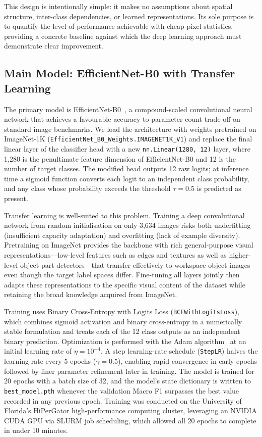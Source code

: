 \documentclass[10pt]{article}
\begin{document}
This design is intentionally simple: it makes no assumptions about spatial structure, inter-class
dependencies, or learned representations.  Its sole purpose is to quantify the level of
performance achievable with cheap pixel statistics, providing a concrete baseline against which
the deep learning approach must demonstrate clear improvement.

\subsection*{Main Model: EfficientNet-B0 with Transfer Learning}

The primary model is EfficientNet-B0~\cite{tan2019efficientnet}, a compound-scaled convolutional
neural network that achieves a favourable accuracy-to-parameter-count trade-off on standard image
benchmarks.  We load the architecture with weights pretrained on ImageNet-1K
(\texttt{EfficientNet\_B0\_Weights.IMAGENET1K\_V1}) and replace the final linear layer of the
classifier head with a new \texttt{nn.Linear(1280,\,12)} layer, where 1,280 is the penultimate
feature dimension of EfficientNet-B0 and 12 is the number of target classes.  The modified head
outputs 12 raw logits; at inference time a sigmoid function converts each logit to an independent
class probability, and any class whose probability exceeds the threshold $\tau = 0.5$ is predicted
as present.

Transfer learning is well-suited to this problem.  Training a deep convolutional network from
random initialisation on only 3,634 images risks both underfitting (insufficient capacity
adaptation) and overfitting (lack of example diversity).  Pretraining on ImageNet provides the
backbone with rich general-purpose visual representations---low-level features such as edges and
textures as well as higher-level object-part detectors---that transfer effectively to workspace
object images even though the target label spaces differ.  Fine-tuning all layers jointly then
adapts these representations to the specific visual content of the dataset while retaining the
broad knowledge acquired from ImageNet.

Training uses Binary Cross-Entropy with Logits Loss (\texttt{BCEWithLogitsLoss}), which combines
sigmoid activation and binary cross-entropy in a numerically stable formulation and treats each
of the 12 class outputs as an independent binary prediction.  Optimization is performed with the
Adam algorithm~\cite{kingma2014adam} at an initial learning rate of $\eta = 10^{-4}$.  A step
learning-rate schedule (\texttt{StepLR}) halves the learning rate every 5 epochs
($\gamma = 0.5$), enabling rapid convergence in early epochs followed by finer parameter
refinement later in training.  The model is trained for 20 epochs with a batch size of 32, and
the model's state dictionary is written to \texttt{best\_model.pth} whenever the validation Macro
F1 surpasses the best value recorded in any previous epoch.  Training was conducted on the
University of Florida's HiPerGator high-performance computing cluster, leveraging an NVIDIA CUDA
GPU via SLURM job scheduling, which allowed all 20 epochs to complete in under 10 minutes.
\end{document}
